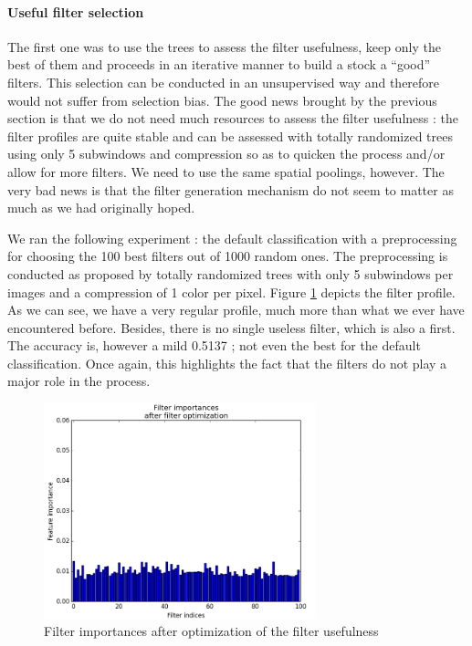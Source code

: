 \documentclass[a4paper]{report}
\begin{document}
	\paragraph{Useful filter selection}
	The first one was to use the trees to assess the filter usefulness, keep only the best of them and proceeds in an iterative manner to build a stock a ``good'' filters. This selection can be conducted in an unsupervised way and therefore would not suffer from selection bias. The good news brought by the previous section is that we do not need much resources to assess the filter usefulness : the filter profiles are quite stable and can be assessed with totally randomized trees using only 5 subwindows and compression so as to quicken the process and/or allow for more filters. We need to use the same spatial poolings, however. The very bad news is that the filter generation mechanism do not seem to matter as much as we had originally hoped. 
	\par
	We ran the following experiment : the default classification with a preprocessing for choosing the 100 best filters out of 1000 random ones. The preprocessing is conducted as proposed by totally randomized trees with only 5 subwindows per images and a compression of 1 color per pixel. 
	Figure \ref{fig:FIOpti} depicts the filter profile. As we can see, we have a very regular profile, much more than what we ever have encountered before. Besides, there is no single useless filter, which is also a first. The accuracy is, however a mild 0.5137 ; not even the best for the default classification.
	Once again, this highlights the fact that the filters do not play a major role in the process.
	
	
	\begin{figure}
		\centering
			\includegraphics[width=0.7\textwidth]{images/FIOpti.png}
		\caption{\label{fig:FIOpti}Filter importances after optimization of the filter usefulness}
	\end{figure}
\end{document}
